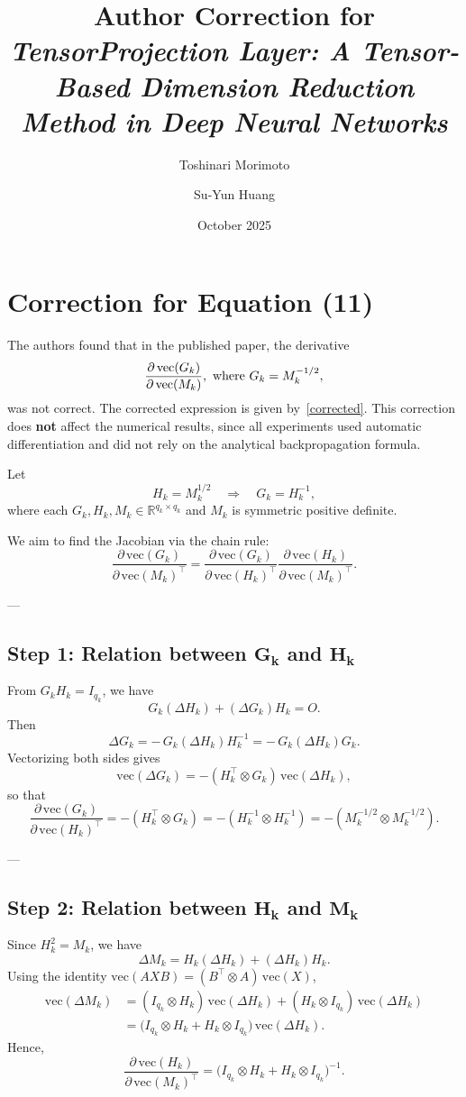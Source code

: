 \documentclass[10pt]{article}
\title{\textbf{Author Correction for}\\[3pt]
\emph{TensorProjection Layer: A Tensor-Based Dimension Reduction Method in Deep Neural Networks}}
\author{Toshinari Morimoto \and Su-Yun Huang}
\date{October 2025}
\begin{document}
\maketitle

\section*{Correction for Equation (11)}

The authors found that in the published paper, the derivative
\[
\frac{\partial\,\mathrm{vec}(G_k)}{\partial\,\mathrm{vec}(M_k)}, ~{\rm where}~ G_k = M_k^{-1/2},
\]
was not correct. 
The corrected expression is given by~\eqref{corrected}. 
This correction does \textbf{not} affect the numerical results,
since all experiments used automatic differentiation
and did not rely on the analytical backpropagation formula.


Let
\[
H_k = M_k^{1/2} \quad \Rightarrow \quad G_k = H_k^{-1},
\]
where each $G_k, H_k, M_k \in \mathbb{R}^{q_k \times q_k}$ and $M_k$ is symmetric positive definite.

We aim to find the Jacobian via the chain rule:
\[
\frac{\partial\,\mathrm{vec}(G_k)}{\partial\,\mathrm{vec}(M_k)^{\!\top}}
=
\frac{\partial\,\mathrm{vec}(G_k)}{\partial\,\mathrm{vec}(H_k)^{\!\top}}
\frac{\partial\,\mathrm{vec}(H_k)}{\partial\,\mathrm{vec}(M_k)^{\!\top}}.
\]

---

\subsection*{Step 1: Relation between $\bm{G_k}$ and $\bm{H_k}$}

From $G_k H_k = I_{q_k}$, we have
\[
G_k(\Delta H_k) + (\Delta G_k)H_k = O.
\]
Then
\[
\Delta G_k = -\,G_k (\Delta H_k) H_k^{-1} = -\,G_k (\Delta H_k) G_k.
\]
Vectorizing both sides gives
\[
\mathrm{vec}(\Delta G_k)
= - (H_k^\top \otimes G_k)\,\mathrm{vec}(\Delta H_k),
\]
so that
\[
\frac{\partial\,\mathrm{vec}(G_k)}{\partial\,\mathrm{vec}(H_k)^{\!\top}}
= - (H_k^\top \otimes G_k)
= - (H_k^{-1} \otimes H_k^{-1})
= - (M_k^{-1/2} \otimes M_k^{-1/2}).
\tag{1}
\]

---

\subsection*{Step 2: Relation between $\bm{H_k}$ and $\bm{M_k}$}

Since $H_k^2 = M_k$, we have
\[
\Delta M_k = H_k (\Delta H_k) + (\Delta H_k) H_k.
\]
Using the identity $\mathrm{vec}(A X B) = (B^\top \otimes A)\,\mathrm{vec}(X)$,
\begin{align*}
\mathrm{vec}(\Delta M_k)
&= (I_{q_k} \otimes H_k)\,\mathrm{vec}(\Delta H_k)
  + (H_k \otimes I_{q_k})\,\mathrm{vec}(\Delta H_k) \\[1mm]
&= \bigl(I_{q_k} \otimes H_k + H_k \otimes I_{q_k}\bigr)\,\mathrm{vec}(\Delta H_k).
\end{align*}
Hence,
\[
\frac{\partial\,\mathrm{vec}(H_k)}{\partial\,\mathrm{vec}(M_k)^{\!\top}}
= \bigl(I_{q_k} \otimes H_k + H_k \otimes I_{q_k}\bigr)^{-1}.
\tag{2}
\]
\end{document}

